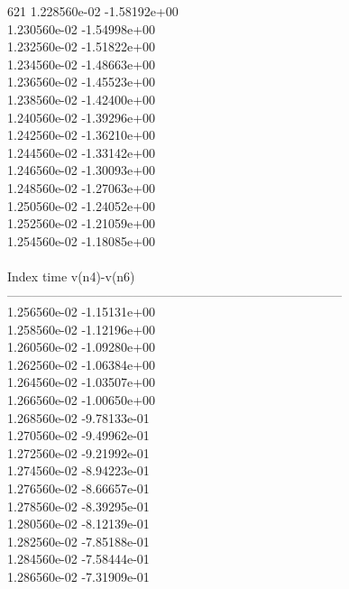 621	1.228560e-02	-1.58192e+00	\\ 	1.230560e-02	-1.54998e+00	\\ 	1.232560e-02	-1.51822e+00	\\ 	1.234560e-02	-1.48663e+00	\\ 	1.236560e-02	-1.45523e+00	\\ 	1.238560e-02	-1.42400e+00	\\ 	1.240560e-02	-1.39296e+00	\\ 	1.242560e-02	-1.36210e+00	\\ 	1.244560e-02	-1.33142e+00	\\ 	1.246560e-02	-1.30093e+00	\\ 	1.248560e-02	-1.27063e+00	\\ 	1.250560e-02	-1.24052e+00	\\ 	1.252560e-02	-1.21059e+00	\\ 	1.254560e-02	-1.18085e+00	\\ \hline
\\ \hline
Index   time            v(n4)-v(n6)     \\ \hline
--------------------------------------------------------------------------------\\ 	1.256560e-02	-1.15131e+00	\\ 	1.258560e-02	-1.12196e+00	\\ 	1.260560e-02	-1.09280e+00	\\ 	1.262560e-02	-1.06384e+00	\\ 	1.264560e-02	-1.03507e+00	\\ 	1.266560e-02	-1.00650e+00	\\ 	1.268560e-02	-9.78133e-01	\\ 	1.270560e-02	-9.49962e-01	\\ 	1.272560e-02	-9.21992e-01	\\ 	1.274560e-02	-8.94223e-01	\\ 	1.276560e-02	-8.66657e-01	\\ 	1.278560e-02	-8.39295e-01	\\ 	1.280560e-02	-8.12139e-01	\\ 	1.282560e-02	-7.85188e-01	\\ 	1.284560e-02	-7.58444e-01	\\ 	1.286560e-02	-7.31909e-01	\\ \hline
